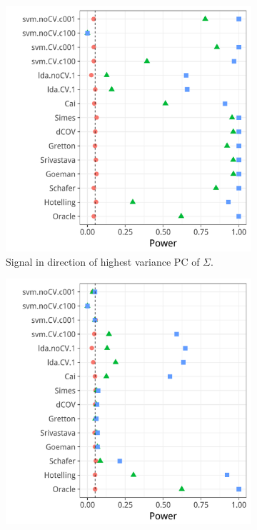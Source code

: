 \documentclass[journal]{IEEEtran}
\begin{document}
\begin{figure}[h]
	\centering
	\caption{Long-memory Brownian motion correlation: $\Sigma=D^{-1} R D^{-1}$ where $D$ is diagonal with $D_{jj}=\sqrt{R_{jj}}$, and $R_{k,l}=\min\{k,l\}$.}	
	\label{fig:dependence_2}
	\begin{subfigure}[t]{.45\columnwidth}
		\centering
		\includegraphics[width=1\columnwidth]{"art/file22"}
		\caption{Signal in direction of highest variance PC of $\Sigma$.} 
		\label{fig:dependence_21}
	\end{subfigure}
	\begin{subfigure}[t]{.45\columnwidth}
		\centering
		\includegraphics[width=1\columnwidth]{"art/file23"}

\end{subfigure}
\end{figure}
\end{document}
